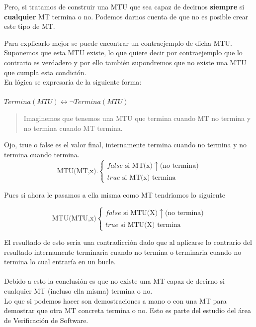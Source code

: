 \documentclass{article}
\begin{document}
Pero, si tratamos de construir una MTU que sea capaz de decirnos \textbf{siempre}
si \textbf{cualquier} MT termina o no. Podemos darnos cuenta de que no es posible
crear este tipo de MT.


Para explicarlo mejor se puede encontrar un contraejemplo de dicha MTU. Suponemos
que esta MTU existe, lo que quiere decir por contraejemplo que lo contrario es
verdadero y por ello también supondremos que no existe una MTU que cumpla esta
condición.\\

En lógica se expresaría de la siguiente forma:\\\\
$ Termina(MTU)\leftrightarrow \neg Termina(MTU)$

\begin{quote}
    Imaginemos que tenemos una MTU que termina cuando MT no termina
    y no termina cuando MT termina.
\end{quote}
Ojo, true o false es el valor final,
internamente termina cuando no termina y no termina cuando termina.
\[
\text{MTU(MT,x).}
\left\{
    \begin{array}{l}
        false \text{ si MT(x)} \uparrow \text{(no termina)}\\
        true \text{ si MT(x) termina}
    \end{array}
\right.
\]

Pues si ahora le pasamos a ella misma como MT tendriamos lo siguiente

\[
\text{MTU(MTU,x)}
\left\{
    \begin{array}{l}
        false \text{ si MTU(X)} \uparrow \text{(no termina)} \\
        true \text{ si MTU(X) termina}
    \end{array}
\right.
\]

El resultado de esto sería una contradicción dado que al aplicarse lo contrario del
resultado internamente terminaria cuando no termina o terminaria cuando no termina
lo cual entraría en un bucle.\\\\

Debido a esto la conclusión es que no existe una MT capaz de decirno si cualquier MT
(incluso ella misma) termina o no.\\

Lo que si podemos hacer son demostraciones a mano o con una MT para demostrar que otra
MT concreta termina o no. Esto es parte del estudio del área de Verificación de Software.
\end{document}
